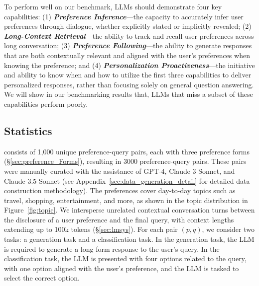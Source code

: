 \label{para:key_capabiilties}

To perform well on our benchmark, LLMs should demonstrate four key capabilities: (1) \textbf{\textit{Preference Inference}}—the capacity to accurately infer user preferences through dialogue, whether explicitly stated or implicitly revealed; (2) \textbf{\textit{Long-Context Retrieval}}—the ability to track and recall user preferences across long conversation; (3) \textbf{\textit{Preference Following}}—the ability to generate responses that are both contextually relevant and aligned with the user’s preferences when knowing the preference; and (4) \textbf{\textit{Personalization Proactiveness}}—the initiative and ability to know when and how to utilize the first three capabilities to deliver personalized responses, rather than focusing solely on general question answering. We will show in our benchmarking results that, LLMs that miss a subset of these capabilities perform poorly.






\vspace{-3mm}

\subsection{\ours{} Statistics}
\vspace{-2mm}
\ours{} consists of 1,000 unique preference-query pairs, each with three preference forms (\S\ref{sec:preference_Forms}), resulting in 3000 preference-query pairs. These pairs were manually curated with the assistance of GPT-4, Claude 3 Sonnet, and Claude 3.5 Sonnet (see Appendix~\ref{sec:data_generation_detail} for detailed data construction methodology). The preferences cover day-to-day topics such as travel, shopping, entertainment, and more, as shown in the topic distribution in Figure~\ref{fig:topic}. We intersperse unrelated contextual conversation turns between the disclosure of a user preference and the final query, with context lengths extending up to 100k tokens (\S\ref{sec:lmsys}). For each pair $(p, q)$, we consider two tasks: a generation task and a classification task. In the generation task, the LLM is required to generate a long-form response to the user's query. In the classification task, the LLM is presented with four options related to the query, with one option aligned with the user's preference, and the LLM is tasked to select the correct option.


